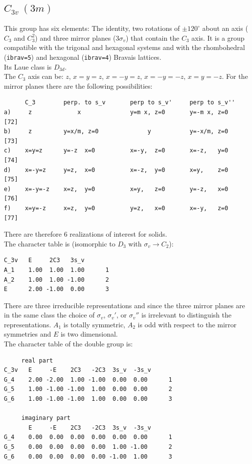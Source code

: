 \documentclass[12pt,a4paper]{article}
\begin{document}
\subsection{\color{web-blue}$C_{3v}\ (3m)$} 
This group has six elements: The identity, two rotations of $\pm120^\circ$ about
an axis ($C_3$ and $C_3^2$) and three mirror planes ($3\sigma_v$) 
that contain the $C_3$ axis.
It is a group compatible with the trigonal and hexagonal systems and with the  
rhombohedral (\texttt{ibrav=5}) and hexagonal (\texttt{ibrav=4}) Bravais lattices. \\ 
Its Laue class is $D_{3d}$. \\
The $C_3$ axis can be: $z$, $x=y=z$, $x=-y=z$, $x=-y=-z$, $x=y=-z$.
For the mirror planes there are the following possibilities:
\begin{verbatim}
      C_3        perp. to s_v       perp to s_v'     perp to s_v''
a)     z             x              y=m x, z=0       y=-m x, z=0     [72]
b)     z         y=x/m, z=0              y           y=-x/m, z=0     [73]
c)    x=y=z      y=-z  x=0          x=-y,  z=0       x=-z,   y=0     [74]
d)    x=-y=z     y=z,  x=0          x=-z,  y=0       x=y,    z=0     [75]
e)    x=-y=-z    x=z,  y=0          x=y,   z=0       y=-z,   x=0     [76]
f)    x=y=-z     x=z,  y=0          y=z,   x=0       x=-y,   z=0     [77]
\end{verbatim}
There are therefore $6$ realizations of interest for solids. \\
The character table is (isomorphic to $D_3$ with $\sigma_v \rightarrow C_2$):
\begin{verbatim}
C_3v   E     2C3   3s_v
A_1    1.00  1.00  1.00      1
A_2    1.00  1.00 -1.00      2
E      2.00 -1.00  0.00      3
\end{verbatim}
There are three irreducible representations and since the three mirror planes
are in the same class the choice of $\sigma_v$, $\sigma_v'$, or $\sigma_v''$ is
irrelevant to distinguish the representations. $A_1$ is totally symmetric,
$A_2$ is odd with respect to the mirror symmetries and $E$ is two dimensional. \\
The character table of the double group is:
\begin{verbatim}
     real part
C_3v   E     -E    2C3   -2C3  3s_v  -3s_v
G_4    2.00 -2.00  1.00 -1.00  0.00  0.00      1
G_5    1.00 -1.00 -1.00  1.00  0.00  0.00      2
G_6    1.00 -1.00 -1.00  1.00  0.00  0.00      3

     imaginary part
       E     -E    2C3   -2C3  3s_v  -3s_v
G_4    0.00  0.00  0.00  0.00  0.00  0.00      1
G_5    0.00  0.00  0.00  0.00  1.00 -1.00      2
G_6    0.00  0.00  0.00  0.00 -1.00  1.00      3
\end{verbatim}
\end{document}
